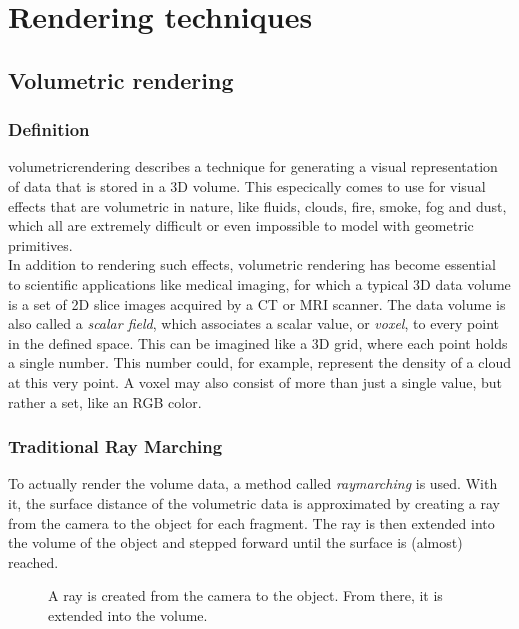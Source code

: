 \section{Rendering techniques}

\subsection{Volumetric rendering}
\label{section:volumetric-rendering}

\subsubsection{Definition}
\Gls{volumetricrendering} describes a technique for generating a visual representation of data that is stored in a 3D volume. 
This especically comes to use for visual effects that are volumetric in nature, like fluids, clouds, fire, smoke, fog and dust, which all are extremely difficult or even impossible to model with geometric primitives.
\\
In addition to rendering such effects, volumetric rendering has become essential to scientific applications like medical imaging, for which a typical 3D data volume is a set of 2D slice images acquired by a CT or MRI scanner.
\emptyline
The data volume is also called a \textit{scalar field}, which associates a scalar value, or \textit{voxel}, to every point in the defined space.
This can be imagined like a 3D grid, where each point holds a single number. This number could, for example, represent the density of a cloud at this very point.
A voxel may also consist of more than just a single value, but rather a set, like an RGB color.

\subsubsection{Traditional Ray Marching}
To actually render the volume data, a method called \textit{\gls{raymarching}} is used. With it, the surface distance of the volumetric data is approximated by creating a ray from the camera to the object for each fragment. The ray is then extended into the volume of the object and stepped forward until the surface is (almost) reached.

\begin{figure}[H]
    \centering
    \caption{A ray is created from the camera to the object. From there, it is extended into the volume.}
\end{figure}

